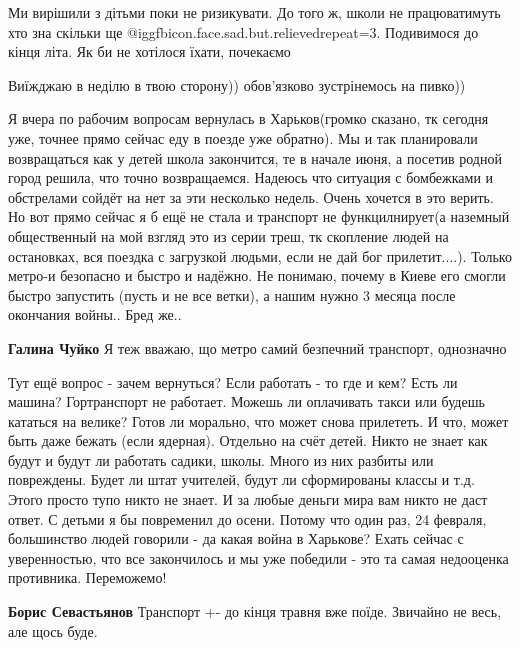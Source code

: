 \begin{itemize}

Ми вирішили з дітьми поки не ризикувати. До того ж, школи не працюватимуть хто
зна скільки ще @igg{fbicon.face.sad.but.relieved}{repeat=3}. Подивимося до кінця літа. Як би не хотілося їхати,
почекаємо

Виїжджаю в неділю в твою сторону)) обов’язково зустрінемось на пивко))


Я вчера по рабочим вопросам вернулась в Харьков(громко сказано, тк сегодня уже,
точнее прямо сейчас еду в поезде уже обратно). Мы и так планировали
возвращаться как у детей школа закончится, те в начале июня, а посетив родной
город решила, что точно возвращаемся. Надеюсь что ситуация с бомбежками и
обстрелами сойдёт на нет за эти несколько недель. Очень хочется в это верить.
Но вот прямо сейчас я б ещё не стала и транспорт не функцилнирует(а наземный
общественный на мой взгляд это из серии треш, тк скопление людей на остановках,
вся поездка с загрузкой людьми, если не дай бог прилетит....). Только метро-и
безопасно и быстро и надёжно. Не понимаю, почему в Киеве его смогли быстро
запустить (пусть и не все ветки), а нашим нужно 3 месяца после окончания войны..
Бред же..

\begin{itemize} %
\textbf{Галина Чуйко} Я теж вважаю, що метро \textemdash самий безпечний транспорт, однозначно
\end{itemize} %


\obeycr
Тут ещё вопрос - зачем вернуться?
Если работать - то где и кем?
Есть ли машина?
Гортранспорт не работает.
Можешь ли оплачивать такси или будешь кататься на велике?
Готов ли морально, что может снова прилететь. И что, может быть даже бежать (если ядерная).
Отдельно на счёт детей.
Никто не знает как будут и будут ли работать садики, школы. Много из них разбиты или повреждены.
Будет ли штат учителей, будут ли сформированы классы и т.д.
Этого просто тупо никто не знает. И за любые деньги мира вам никто не даст ответ.
С детьми я бы повременил до осени.
Потому что один раз, 24 февраля, большинство людей говорили - да какая война в Харькове?
Ехать сейчас с уверенностью, что все закончилось и мы уже победили - это та самая недооценка противника.
Переможемо!
\restorecr

\begin{itemize} %
\textbf{Борис Севастьянов} Транспорт +- до кінця травня вже поїде. Звичайно не весь, але щось буде.


\end{itemize}
\end{itemize}
